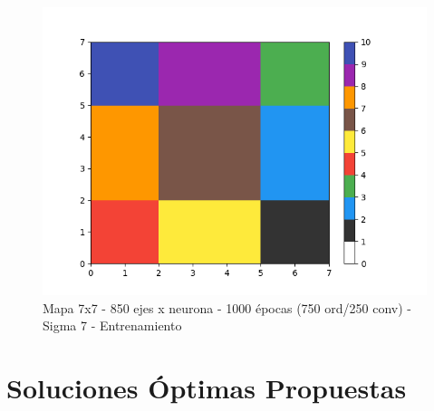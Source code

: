 \begin{figure}[h]
  \begin{center}
    \includegraphics[scale=0.4]{../img/map7x7_1000ep_850en_sigma7_faseord750_corregido.png}
  \caption{Mapa 7x7 - 850 ejes x neurona - 1000 épocas (750 ord/250 conv) - Sigma 7 - Entrenamiento}
  \end{center}
\end{figure}

\newpage
\section{Soluciones Óptimas Propuestas}






